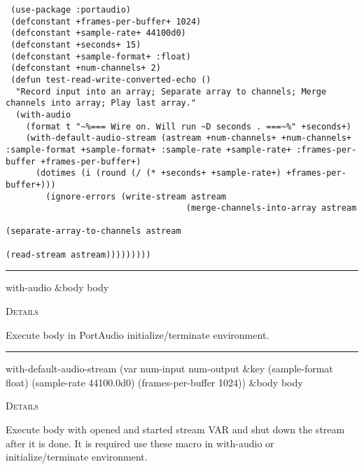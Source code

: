 \documentclass[a4paper]{report}
\begin{document}
    \begin{verbatim}
 (use-package :portaudio)
 (defconstant +frames-per-buffer+ 1024)
 (defconstant +sample-rate+ 44100d0)
 (defconstant +seconds+ 15)
 (defconstant +sample-format+ :float)
 (defconstant +num-channels+ 2)
 (defun test-read-write-converted-echo ()
  "Record input into an array; Separate array to channels; Merge channels into array; Play last array." 
  (with-audio
    (format t "~%=== Wire on. Will run ~D seconds . ===~%" +seconds+) 
    (with-default-audio-stream (astream +num-channels+ +num-channels+ :sample-format +sample-format+ :sample-rate +sample-rate+ :frames-per-buffer +frames-per-buffer+) 
      (dotimes (i (round (/ (* +seconds+ +sample-rate+) +frames-per-buffer+)))
        (ignore-errors (write-stream astream
                                    (merge-channels-into-array astream
                                                               (separate-array-to-channels astream
                                                                                           (read-stream astream)))))))))\end{verbatim}



    \rule{\linewidth}{0.1mm}
    
    \label{portaudio__fun__with-audio}
    \begin{defun}[Macro]
    with-audio $\&$body body


	
    \bigskip
    \textsc{Details}

Execute body in PortAudio initialize/terminate environment.


    
    \end{defun}
  
  

    \rule{\linewidth}{0.1mm}
    
    \label{portaudio__fun__with-default-audio-stream}
    \begin{defun}[Macro]
    with-default-audio-stream (var num-input num-output $\&$key (sample-format float) (sample-rate 44100.0d0)
 (frames-per-buffer 1024)) $\&$body body


	
    \bigskip
    \textsc{Details}

Execute body with opened and started stream VAR and shut down   the stream after it is done. It is required use these macro in with-audio or initialize/terminate environment.


    
    \end{defun}
  
\end{document}
